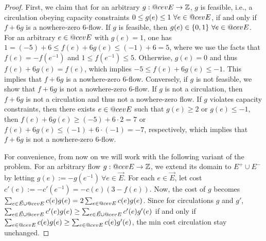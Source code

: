 \documentclass[11pt]{article}
\makeatletter
\newcommand{\Z}{\mathbb{Z}}
\DeclareRobustCommand{\cev}[1]{{\mathpalette\do@cev{#1}}}
\newcommand{\do@cev}[2]{\vbox{\offinterlineskip
    \sbox\z@{$\m@th#1 x$}\ialign{##\cr
      \hidewidth\reflectbox{$\m@th#1\vec{}\mkern4mu$}\hidewidth\cr
      \noalign{\kern-\ht\z@}
      $\m@th#1#2$\cr
    }}}
\makeatother
\begin{document}
\begin{proof}
    First, we claim that for an arbitrary $g:\cev{E}\rightarrow\Z$, $g$ is feasible, i.e., a circulation obeying capacity constraints $0\leq g(e)\leq 1\ \forall e\in \cev{E}$, if and only if $f+6g$ is a nowhere-zero $6$-flow. If $g$ is feasible, then $g(e)\in\{0,1\}\ \forall e\in\cev{E}$. For an arbitrary $e\in \cev{E}$ with $g(e)=1$, one has $1=(-5)+6\leq f(e)+6g(e)\leq (-1)+6=5$, where we use the facts that $f(e)=-f(e^{-1})$ and $1\leq f(e^{-1})\leq 5$. Otherwise, $g(e)=0$ and thus $f(e)+6g(e)=f(e)$, which implies $-5\leq f(e)+6g(e) \leq -1$. This implies that $f+6g$ is a nowhere-zero $6$-flow. Conversely, if $g$ is not feasible, we show that  $f+6g$ is not a nowhere-zero $6$-flow. If $g$ is not a circulation, then $f+6g$ is not a circulation and thus not a nowhere-zero flow. If $g$ violates capacity constraints, then there exists $e\in \cev{E}$ such that $g(e)\geq 2$ or $g(e)\leq -1$, then $f(e)+6g(e)\geq (-5)+6\cdot 2=7$ or $f(e)+6g(e)\leq (-1)+6\cdot (-1)=-7$, respectively, which implies that $f+6g$ is not a nowhere-zero $6$-flow.

For convenience, from now on we will work with the following variant of the problem. For an arbitrary flow $g:\cev{E}\rightarrow \Z$, we extend its domain to $E^+\cup E^-$ 
by letting $g(e):=-g(e^{-1})\ \forall e\in \vec{E}$. For each $e\in \vec{E}$, let cost $c'(e):=-c'(e^{-1})=-c(e)(3-f(e))$. 
Now, the cost of $g$ becomes $\sum_{e\in \vec{E}\cup \cev{E}}c(e)g(e)=2\sum_{e\in \cev{E}}c(e)g(e)$. Since for circulations $g$ and $g'$, $\sum_{e\in \vec{E}\cup \cev{E}}c'(e)g(e)\geq \sum_{e\in \vec{E}\cup \cev{E}}c'(e)g'(e)$ if and only if $\sum_{e\in \cev{E}}c(e)g(e)\geq \sum_{e\in \cev{E}}c(e)g'(e)$, the min cost circulation stay unchanged. 



\end{proof}
\end{document}
